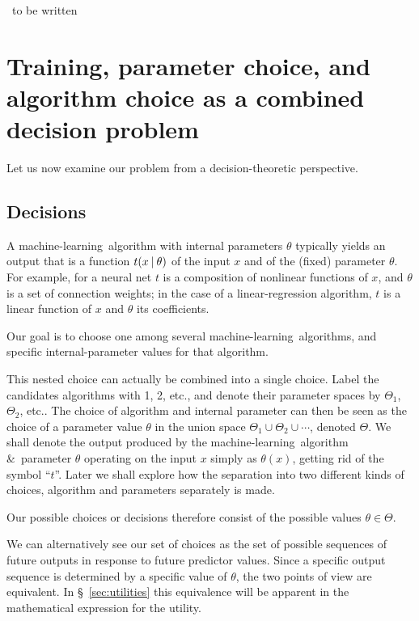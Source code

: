 \documentclass[\ifafour a4paper,12pt,\else a5paper,10pt,\fi%
onecolumn,oneside,article,%
british%
]{memoir}
\theoremstyle{remark}
\theoremstyle{innote}
\newcommand*{\amp}{\&}
\renewcommand*{\|}[1][]{\nonscript\:#1\vert\nonscript\:\mathopen{}}
\newcommand*{\sect}{\S}%
\newcommand*{\etc}{{etc.}}
\newcommand*{\wrench}{{\fontencoding{U}\fontfamily{fontawesomethree}\selectfont\symbol{114}}}
\newcommand{\mynote}[1]{ {\color{notecolour}#1}}
\newcommand*{\ml}{machine-learning}
\begin{document}
\mynote{\wrench\ to be written}

\section{Training, parameter choice, and algorithm choice as a combined
  decision problem}
\label{sec:training_as_decision}

Let us now examine our problem from a decision-theoretic perspective.

\subsection{Decisions}
\label{sec:decisions}

A \ml\ algorithm with internal parameters $\theta$ typically yields an
output that is a function $t(x \| \theta)$ of the input $x$ and of the
(fixed) parameter $\theta$. For example, for a neural net $t$ is a
composition of nonlinear functions of $x$, and $\theta$ is a set of
connection weights; in the case of a linear-regression algorithm, $t$ is a
linear function of $x$ and $\theta$ its coefficients.

Our goal is to choose one among several \ml\ algorithms, and specific
internal-parameter values for that algorithm.

This nested choice can actually be combined into a single choice. Label the
candidates algorithms with 1, 2, \etc, and denote their parameter spaces by
$\varTheta_{1}$, $\varTheta_{2}$, \etc. The choice of algorithm and
internal parameter can then be seen as the choice of a parameter value
$\theta$ in the union space $\varTheta_{1} \cup \varTheta_{2} \cup\dotsb$,
denoted $\varTheta$. We shall denote the output produced by the \ml\
algorithm \amp\ parameter $\theta$ operating on the input $x$ simply as
$\theta(x)$, getting rid of the symbol \enquote{$t$}. Later we shall
explore how the separation into two different kinds of choices, algorithm
and parameters separately is made.

Our possible choices or decisions therefore consist of the possible values
$\theta \in \varTheta$.

We can alternatively see our set of choices as the set of possible
sequences of future outputs in response to future predictor values.
Since a specific output sequence is determined by a specific value of
$\theta$, the two points of view are equivalent. In
\sect~\ref{sec:utilities} this equivalence will be apparent in the
mathematical expression for the utility.
\end{document}
